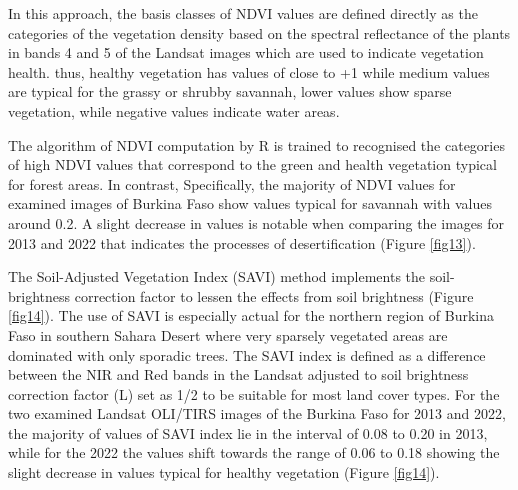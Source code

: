 \documentclass[knowledge,article,submit,pdftex,moreauthors]{Definitions/mdpi}
\begin{document}
In this approach, the basis classes of NDVI values are defined directly as the categories of the vegetation density based on the spectral reflectance of the plants in bands 4 and 5 of the Landsat images which are used to indicate vegetation health. thus, healthy vegetation has values of close to +1 while medium values are typical for the grassy or shrubby savannah, lower values show sparse vegetation, while negative values indicate water areas. 

The algorithm of NDVI computation by R is trained to recognised   the categories of high NDVI values that correspond to the green and health vegetation typical for forest areas. In contrast, Specifically, the majority of NDVI values for examined images of Burkina Faso show values typical for savannah with values around 0.2. A slight decrease in values is notable when comparing the images for 2013 and 2022 that indicates the processes of desertification (Figure \ref{fig13}).

The Soil-Adjusted Vegetation Index (SAVI) method implements the soil-brightness correction factor to lessen the effects from soil brightness (Figure \ref{fig14}). The use of SAVI is especially actual for the northern region of Burkina Faso in southern Sahara Desert where very sparsely vegetated areas are dominated with only sporadic trees. The SAVI index is defined as a difference between the NIR and Red bands in the Landsat adjusted to soil brightness correction factor (L) set as 1/2 to be suitable for most land cover types. For the two examined Landsat OLI/TIRS images of the Burkina Faso for 2013 and 2022, the majority of values of SAVI index lie in the interval of 0.08 to 0.20 in 2013, while for the 2022 the values shift towards the range of 0.06 to 0.18 showing the slight decrease in values typical for healthy vegetation (Figure \ref{fig14}).
\end{document}
